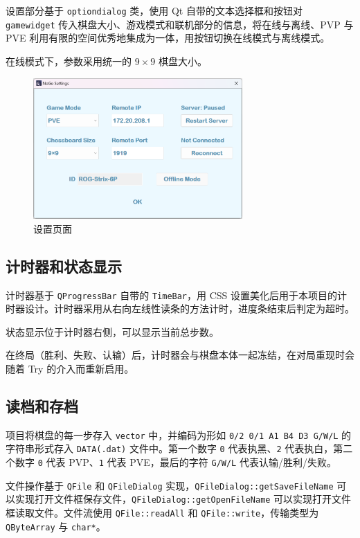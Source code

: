 \documentclass{noithesis}
\begin{document}
	设置部分基于 \verb|optiondialog| 类，使用 Qt 自带的文本选择框和按钮对 \verb|gamewidget| 传入棋盘大小、游戏模式和联机部分的信息，将在线与离线、PVP 与 PVE 利用有限的空间优秀地集成为一体，用按钮切换在线模式与离线模式。
	
	在线模式下，参数采用统一的 $9\times 9$ 棋盘大小。
		
	\begin{figure}[!htb]{
			\centering
			\includegraphics[width=8cm]{img/web1.png}
			\caption{设置页面}
		}
	\end{figure}
	
	\subsection{计时器和状态显示}
	
	计时器基于 \verb|QProgressBar| 自带的 \verb|TimeBar|，用 CSS 设置美化后用于本项目的计时器设计。计时器采用从右向左线性读条的方法计时，进度条结束后判定为超时。
	
	状态显示位于计时器右侧，可以显示当前总步数。
	
	在终局（胜利、失败、认输）后，计时器会与棋盘本体一起冻结，在对局重现时会随着 Try 的介入而重新启用。
	
	\subsection{读档和存档}
	
	项目将棋盘的每一步存入 \verb|vector| 中，并编码为形如 \verb|0/2 0/1 A1 B4 D3 G/W/L| 的字符串形式存入 \verb|DATA(.dat)| 文件中。第一个数字 \verb|0| 代表执黑、\verb|2| 代表执白，第二个数字 \verb|0| 代表 PVP、\verb|1| 代表 PVE，最后的字符 \verb|G/W/L| 代表认输/胜利/失败。
	
	文件操作基于 \verb|QFile| 和 \verb|QFileDialog| 实现，\verb|QFileDialog::getSaveFileName| 可以实现打开文件框保存文件，\verb|QFileDialog::getOpenFileName| 可以实现打开文件框读取文件。文件流使用 \verb|QFile::readAll| 和 \verb|QFile::write|，传输类型为 \verb|QByteArray| 与 \verb|char*|。
	
\end{document}
